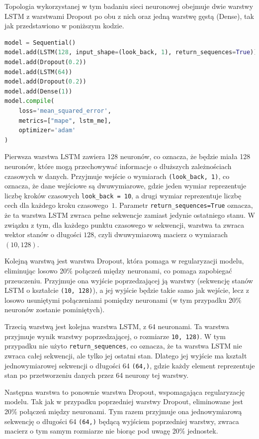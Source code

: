 \documentclass[polish, twoside, 12pt, a4paper]{article}
\theoremstyle{definition}
\theoremstyle{plain}
\theoremstyle{remark}
\newcommand{\code}[1]{\lstinline{#1}}
\begin{document}
Topologia wykorzystanej w tym badaniu sieci neuronowej obejmuje dwie warstwy LSTM z warstwami Dropout po obu z nich oraz jedną warstwę gęstą (Dense), tak jak przedstawiono w poniższym kodzie.
\begin{lstlisting}[language=Python, numbers=none]
model = Sequential()
model.add(LSTM(128, input_shape=(look_back, 1), return_sequences=True))
model.add(Dropout(0.2))
model.add(LSTM(64))
model.add(Dropout(0.2))
model.add(Dense(1))
model.compile(
    loss='mean_squared_error', 
    metrics=["mape", lstm_me], 
    optimizer='adam'
)
\end{lstlisting}	
Pierwsza warstwa LSTM zawiera 128 neuronów, co oznacza, że będzie miała 128 neuronów, które mogą przechowywać informacje o dłuższych zależnościach czasowych w danych. Przyjmuje wejście o wymiarach \code{(look_back, 1)}, co oznacza, że dane wejściowe są dwuwymiarowe, gdzie jeden wymiar reprezentuje liczbę kroków czasowych \code{look_back = 10}, a drugi wymiar reprezentuje liczbę cech dla każdego kroku czasowego~\(1\). Parametr \code{return_sequences=True} oznacza, że ta warstwa LSTM zwraca pełne sekwencje zamiast jedynie ostatniego stanu. W związku z tym, dla każdego punktu czasowego w sekwencji, warstwa ta zwraca wektor stanów o długości \(128\), czyli dwuwymiarową macierz o wymiarach \((10, 128)\). 

Kolejną warstwą jest warstwa Dropout, która pomaga w regularyzacji modelu, eliminując losowo 20\% połączeń między neuronami, co pomaga zapobiegać przeuczeniu. Przyjmuje ona wyjście poprzedzającej ją warstwy (sekwencję stanów LSTM o kształcie \code{(10, 128)}), a jej wyjście będzie takie samo jak wejście, lecz z losowo usuniętymi połączeniami pomiędzy neuronami (w tym przypadku 20\% neuronów zostanie pominiętych). 

Trzecią warstwą jest kolejna warstwa LSTM, z 64 neuronami. Ta warstwa przyjmuje wynik warstwy poprzedzającej, o rozmiarze \code{10, 128)}. W tym przypadku nie użyto \code{return_sequences}, co oznacza, że ta warstwa LSTM nie zwraca całej sekwencji, ale tylko jej ostatni stan. Dlatego jej wyjście ma kształt jednowymiarowej sekwencji o długości 64 \code{(64,)}, gdzie każdy element reprezentuje stan po przetworzeniu danych przez 64 neurony tej warstwy. 

Następna warstwa to ponownie warstwa Dropout, wspomagająca regularyzację modelu. Tak jak w przypadku poprzedniej warstwy Dropout, eliminowane jest 20\% połączeń między neuronami. Tym razem przyjmuje ona jednowymiarową sekwencję o długości 64 \code{(64,)} będącą wyjściem poprzedniej warstwy, zwraca macierz o tym samym rozmiarze nie biorąc pod uwagę 20\% jednostek.
\end{document}
